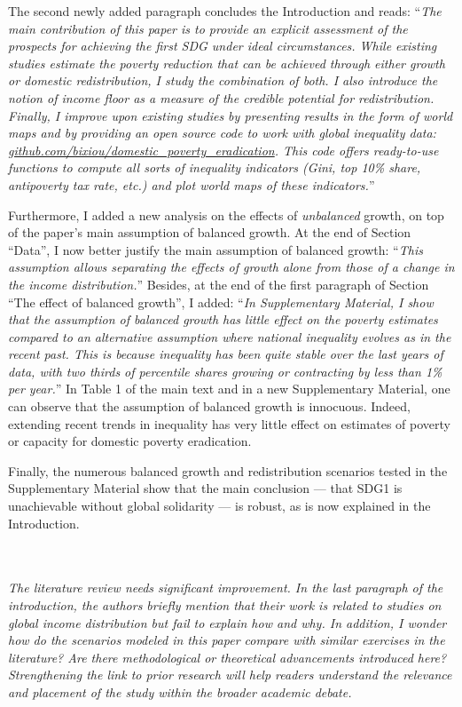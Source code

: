 \documentclass[12pt,english]{article}
\begin{document}
The second newly added paragraph concludes the Introduction and reads: ``\textit{The main contribution of this paper is to provide an explicit assessment of the prospects for achieving the first SDG under ideal circumstances. While existing studies estimate the poverty reduction that can be achieved through either growth or domestic redistribution, I study the combination of both. I also introduce the notion of \textit{income floor} as a measure of the credible potential for redistribution. Finally, I improve upon existing studies by presenting results in the form of world maps and by providing an open source code to work with global inequality data: \href{https://github.com/bixiou/domestic_poverty_eradication}{github.com/bixiou/domestic\_poverty\_eradication}. This code offers ready-to-use functions to compute all sorts of inequality indicators (Gini, top 10\% share, antipoverty tax rate, etc.) and plot world maps of these indicators.}''

Furthermore, I added a new analysis on the effects of \textit{unbalanced} growth, on top of the paper's main assumption of balanced growth. At the end of Section ``Data'', I now better justify the main assumption of balanced growth: ``\textit{This assumption allows separating the effects of growth alone from those of a change in the income distribution.}'' Besides, at the end of the first paragraph of Section ``The effect of balanced growth'', I added: 
``\textit{In Supplementary Material, I show that the assumption of balanced growth has little effect on the poverty estimates compared to an alternative assumption where national inequality evolves as in the recent past. This is because inequality has been quite stable over the last years of data, with two thirds of percentile shares growing or contracting by less than 1\% per year.}'' In Table 1 of the main text and in a new Supplementary Material, one can observe that the assumption of balanced growth is innocuous. Indeed, extending recent trends in inequality has very little effect on estimates of poverty or capacity for domestic poverty eradication. 

Finally, the numerous balanced growth and redistribution scenarios tested in the Supplementary Material show that the main conclusion --- that SDG1 is unachievable without global solidarity --- is robust, as is now explained in the Introduction.

~\\ ~\\

\textit{The literature review needs significant improvement. In the last paragraph of the introduction, the authors briefly mention that their work is related to studies on global income distribution but fail to explain how and why. In addition, I wonder how do the scenarios modeled in this paper compare with similar exercises in the literature? Are there methodological or theoretical advancements introduced here? Strengthening the link to prior research will help readers understand the relevance and placement of the study within the broader academic debate. }~\\
\end{document}

